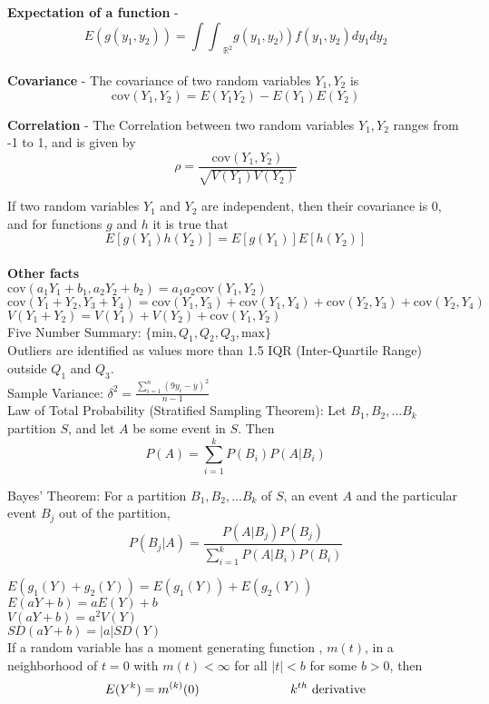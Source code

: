 \documentclass{scrartcl}
\begin{document}
\textbf{Expectation of a function} - $$E\left(g\left(y_1,y_2\right)\right) = {\int\int}_{\mathbb{R}^2} g\left(y_1,y_2)\right)f\left(y_1,y_2\right)dy_1dy_2$$\\

\textbf{Covariance} - The covariance of two random variables $Y_1, Y_2$ is $$\text{cov}\left(Y_1,Y_2\right) = E\left(Y_1Y_2\right) - E(Y_1)E(Y_2)$$

\textbf{Correlation} - The Correlation between two random variables $Y_1, Y_2$ ranges from -1 to 1, and is given by $$\rho = \frac{\text{cov}\left(Y_1,Y_2\right)}{\sqrt{V(Y_1)V(Y_2)}}$$

If two random variables $Y_1$ and $Y_2$ are independent, then their covariance is 0, and for functions $g$ and $h$ it is true that $$E\left[g(Y_1)h(Y_2)\right] = E\left[g(Y_1)\right]E\left[h(Y_2)\right]$$\\

\textbf{Other facts}\\

$\text{cov}\left(a_1Y_1+b_1,a_2Y_2+b_2\right) = a_1a_2\text{cov}\left(Y_1,Y_2\right)$\\

$\text{cov}\left(Y_1+Y_2,Y_3+Y_4\right) = \text{cov}\left(Y_1,Y_3\right) + \text{cov}\left(Y_1,Y_4\right) + \text{cov}\left(Y_2,Y_3\right) + \text{cov}\left(Y_2,Y_4\right)$\\

$V\left(Y_1+Y_2\right) = V(Y_1) + V(Y_2) + \text{cov}\left(Y_1,Y_2\right)$\\

Five Number Summary: $\{\text{min}, Q_1, Q_2, Q_3, \text{max}\}$\\

Outliers are identified as values more than 1.5 IQR (Inter-Quartile Range) outside $Q_1$ and $Q_3$.\\

Sample Variance: $\delta^2 = \frac{\sum_{i=1}^n\left(9y_i-\overline{y}\right)^2}{n-1}$\\

Law of Total Probability (Stratified Sampling Theorem): Let $B_1, B_2, ... B_k$ partition $S$, and let $A$ be some event in $S$. Then $$P(A) = \sum_{i=1}^kP(B_i)P(A|B_i)$$

Bayes' Theorem: For a partition $B_1, B_2, ... B_k$ of $S$, an event $A$ and the particular event $B_j$ out of the partition, $$P(B_j|A) = \frac{P(A|B_j)P(B_j)}{\sum_{i=1}^kP(A|B_i)P(B_i)}$$

$E(g_1(Y) + g_2(Y)) = E(g_1(Y)) + E(g_2(Y))$\\

$E(aY+b) = aE(Y) + b$\\

$V(aY+b) = a^2V(Y)$\\

$SD(aY+b) = |a|SD(Y)$\\

If a random variable has a moment generating function , $m(t)$, in a neighborhood of $t=0$ with $m(t)<\infty$ for all $|t|< b$ for some $b>0$, then $$E(Y^k) = m^{(k)}(0) \text{\hspace{1in}$k^{th}$ derivative}$$
\end{document}
